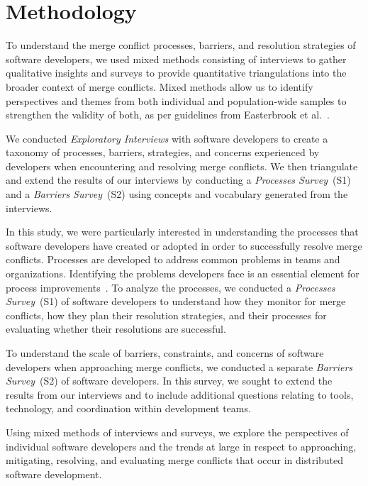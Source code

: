 
\section{Methodology}\label{methodology}


To understand the merge conflict processes, barriers, and resolution strategies of software developers, we used mixed methods consisting of interviews to gather qualitative insights and surveys to provide quantitative triangulations into the broader context of merge conflicts.
Mixed methods allow us to identify perspectives and themes from both individual and population-wide samples to strengthen the validity of both, as per guidelines from Easterbrook et al.~\cite{easterbrook2008selecting}.

We conducted \textit{Exploratory Interviews} with software developers to create a taxonomy of processes, barriers, strategies, and concerns experienced by developers when encountering and resolving merge conflicts.
We then triangulate and extend the results of our interviews by conducting a \textit{Processes Survey}~(S1) and a \textit{Barriers Survey}~(S2) using concepts and vocabulary generated from the interviews. 

In this study, we were particularly interested in understanding the processes that software developers have created or adopted in order to successfully resolve merge conflicts.
Processes are developed to address common problems in teams and organizations.
Identifying the problems developers face is an essential element for process improvements~\cite{beecham2003software}.
To analyze the processes, we conducted a \textit{Processes Survey}~(S1) of software developers to understand how they monitor for merge conflicts, how they plan their resolution strategies, and their processes for evaluating whether their resolutions are successful.

To understand the scale of barriers, constraints, and concerns of software developers when approaching merge conflicts, we conducted a separate \textit{Barriers Survey}~(S2) of software developers.
In this survey, we sought to extend the results from our interviews and to include additional questions relating to tools, technology, and coordination within development teams.

Using mixed methods of interviews and surveys, we explore the perspectives of individual software developers and the trends at large in respect to approaching, mitigating, resolving, and evaluating merge conflicts that occur in distributed software development.


